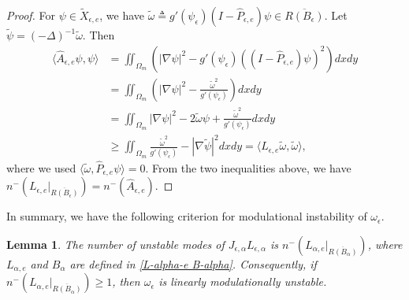 \documentclass[1 [leqno, 11pt]{amsart}
\numberwithin{equation}{section}
\let\ep=\epsilon
\newtheorem{lemma}[Theorem]{Lemma}
\begin{document}
\begin{CJK*}{GBK}{song}
\begin{proof}
For $\psi\in\tilde{X}_{\ep, e}$, we have $\tilde{\omega} \triangleq g'(\psi_\ep)(I - \hat{P}_{\ep,e})\psi \in \overline{R(B_\ep)}$. Let $\tilde{\psi} = (-\Delta)^{-1}\tilde{\omega}$. Then
\begin{align*}
\langle\hat{A}_{\ep,e} \psi, \psi\rangle
&= \iint_{\Omega_m} \left( |\nabla \psi|^2 - g'(\psi_\ep)((I - \hat{P}_{\ep,e})\psi)^2\right) dxdy \\
&= \iint_{\Omega_m} \left( |\nabla \psi|^2 - \frac{\tilde{\omega}^2}{g'(\psi_\ep)}\right)dxdy \\
&= \iint_{\Omega_m} |\nabla \psi|^2 - 2 \tilde{\omega} \psi + \frac{\tilde{\omega}^2}{g'(\psi_\ep)}dxdy \\
& \geq \iint_{\Omega_m}  \frac{\tilde{\omega}^2}{g'(\psi_\ep)} - |\nabla \tilde{\psi}|^2 dxdy = \langle L_{\ep,e}\tilde{\omega}, \tilde{\omega} \rangle,
\end{align*}
where we used $\langle\tilde \omega, \hat{P}_{\ep,e}\psi\rangle=0$.
From the two inequalities above, we have $n^-\left( L_{\ep,e} |_{\overline{R(B_\ep)}} \right) = n^-\left(\hat{A}_{\ep,e}\right)$.
\end{proof}
\fi

In summary, we have the following criterion for modulational instability of $\omega_\ep$.
\begin{lemma}\label{modulational case:unstable modes}
The number of unstable  modes of $J_{\ep,\alpha}L_{\ep,\alpha}$ is $n^-\left(L_{\alpha,e}|_{\overline{R(B_\alpha)}} \right)$, where $L_{\alpha,e}$ and $B_\alpha$ are defined in  \eqref{L-alpha-e B-alpha}. Consequently, if $n^-\left(L_{\alpha,e}|_{\overline{R(B_\alpha)}} \right)\geq1$, then $\omega_\ep$ is linearly modulationally unstable.
\end{lemma}


\end{CJK*}
\end{document}
